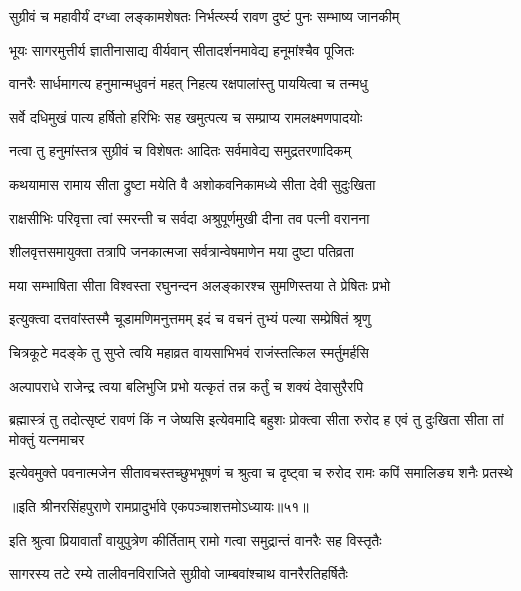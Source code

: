 \twolineshloka
{सुग्रीवं च महावीर्यं दग्ध्वा लङ्कामशेषतः}
{निर्भर्त्य्स्य रावण दुष्टं पुनः सम्भाष्य जानकीम्} %

\twolineshloka
{भूयः सागरमुत्तीर्य ज्ञातीनासाद्य वीर्यवान्}
{सीतादर्शनमावेद्य हनूमांश्चैव पूजितः} %

\twolineshloka
{वानरैः सार्धमागत्य हनुमान्मधुवनं महत्}
{निहत्य रक्षपालांस्तु पाययित्वा च तन्मधु} %

\twolineshloka
{सर्वे दधिमुखं पात्य हर्षितो हरिभिः सह}
{खमुत्पत्य च सम्प्राप्य रामलक्ष्मणपादयोः} %

\twolineshloka
{नत्वा तु हनुमांस्तत्र सुग्रीवं च विशेषतः}
{आदितः सर्वमावेद्य समुद्रतरणादिकम्} %

\twolineshloka
{कथयामास रामाय सीता द्रुष्टा मयेति वै}
{अशोकवनिकामध्ये सीता देवी सुदुःखिता} %

\twolineshloka
{राक्षसीभिः परिवृत्ता त्वां स्मरन्ती च सर्वदा}
{अश्रुपूर्णमुखी दीना तव पत्नी वरानना} %

\twolineshloka
{शीलवृत्तसमायुक्ता तत्रापि जनकात्मजा}
{सर्वत्रान्वेषमाणेन मया दुष्टा पतिव्रता} %

\twolineshloka
{मया सम्भाषिता सीता विश्वस्ता रघुनन्दन}
{अलङ्कारश्च सुमणिस्तया ते प्रेषितः प्रभो} %

\twolineshloka
{इत्युक्त्वा दत्तवांस्तस्मै चूडामणिमनुत्तमम्}
{इदं च वचनं तुभ्यं पल्या सम्प्रेषितं श्रृणु} %

\twolineshloka
{चित्रकूटे मदङ्के तु सुप्ते त्वयि महाव्रत}
{वायसाभिभवं राजंस्तत्किल स्मर्तुमर्हसि} %

\twolineshloka
{अल्पापराधे राजेन्द्र त्वया बलिभुजि प्रभो}
{यत्कृतं तन्न कर्तुं च शक्यं देवासुरैरपि} %

\threelineshloka
{ब्रह्मास्त्रं तु तदोत्सृष्टं रावणं किं न जेष्यसि}
{इत्येवमादि बहुशः प्रोक्त्वा सीता रुरोद ह}
{एवं तु दुःखिता सीता तां मोक्तुं यत्नमाचर} %

\fourlineindentedshloka
{इत्येवमुक्ते पवनात्मजेन}
{सीतावचस्तच्छुभभूषणं च}
{श्रुत्वा च दृष्ट्वा च रुरोद रामः}
{कपिं समालिङ्य शनैः प्रतस्थे} %

॥इति श्रीनरसिंहपुराणे रामप्रादुर्भावे एकपञ्चाशत्तमोऽध्यायः॥५१॥



\twolineshloka
{इति श्रुत्वा प्रियावार्तां वायुपुत्रेण कीर्तिताम्}
{रामो गत्वा समुद्रान्तं वानरैः सह विस्तृतैः} %

\twolineshloka
{सागरस्य तटे रम्ये तालीवनविराजिते}
{सुग्रीवो जाम्बवांश्चाथ वानरैरतिहर्षितैः} %

